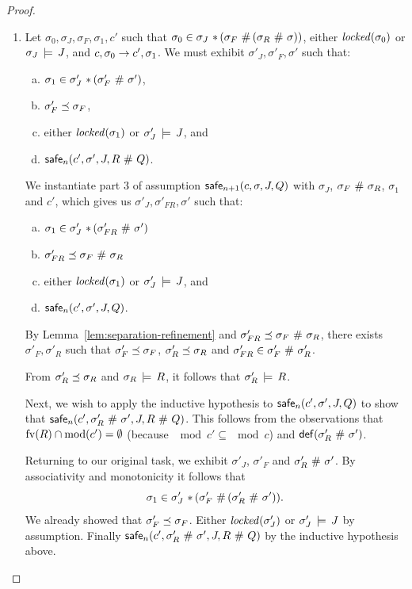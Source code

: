 \documentclass[11pt]{report}
\begin{document}
\begin{proof}
\begin{enumerate}
		\item Let $\sigma_0,\sigma_J,\sigma_F,\sigma_1,c'$ such that $\sigma_0 \in \sigma_J \operatorname{\,\ast\,} (\sigma_F \operatorname{\,\#\,} (\sigma_R \operatorname{\,\#\,} \sigma))$, either $\mathit{locked}(\sigma_0)$ or $\sigma_J \,\models\, J$, and $c,\sigma_0 \rightarrow c',\sigma_1$. We must exhibit $\sigma'_J,\sigma'_F,\sigma'$ such that: \begin{enumerate}[(a)]
			\item $\sigma_1 \in \sigma'_J \operatorname{\,\ast\,} (\sigma'_F \operatorname{\,\#\,} \sigma')$,
			\item $\sigma'_F \preceq \sigma_F$, 
			\item either $\mathit{locked}(\sigma_1)$ or $\sigma'_J \,\models\, J$, and
			\item $\mathsf{safe}_{n}(c',\sigma',J,R \operatorname{\,\#\,} Q)$. 
		\end{enumerate}

		We instantiate part 3 of assumption $\mathsf{safe}_{n+1}(c,\sigma,J,Q)$ with $\sigma_J$, $\sigma_F \operatorname{\,\#\,} \sigma_R$, $\sigma_1$ and $c'$, which gives us $\sigma'_J, \sigma'_{FR}, \sigma'$ such that: \begin{enumerate}[(a)]
			\item $\sigma_1 \in \sigma'_J \operatorname{\,\ast\,} (\sigma'_{FR} \operatorname{\,\#\,} \sigma')$
			\item $\sigma'_{FR} \preceq \sigma_F \operatorname{\,\#\,} \sigma_R$
			\item either $\mathit{locked}(\sigma_1)$ or $\sigma'_J \,\models\, J$, and
			\item $\mathsf{safe}_{n}(c',\sigma',J,Q)$.
		\end{enumerate}	

		By Lemma~\ref{lem:separation-refinement} and $\sigma'_{FR} \preceq \sigma_F \operatorname{\,\#\,} \sigma_R$, there exists $\sigma'_F,\sigma'_R$ such that $\sigma'_F \preceq \sigma_F$, $\sigma'_R \preceq \sigma_R$ and $\sigma'_{FR} \in \sigma'_F \operatorname{\,\#\,} \sigma'_R$. 

		From $\sigma'_R \preceq \sigma_R$ and $\sigma_R \,\models\, R$, it follows that $\sigma'_R \,\models\, R$. 

		Next, we wish to apply the inductive hypothesis to $\mathsf{safe}_{n}(c',\sigma',J,Q)$ to show that $\mathsf{safe}_{n}(c',\sigma'_R \operatorname{\,\#\,} \sigma',J,R \operatorname{\,\#\,} Q)$. This follows from the observations that $\mathrm{fv}(R) \cap \mathrm{mod}(c') = \operatorname{\emptyset}$ (because $\mod{c'} \subseteq \mod{c}$) and $\mathsf{def}(\sigma'_R \operatorname{\,\#\,} \sigma')$. 

		Returning to our original task, we exhibit $\sigma'_J$, $\sigma'_F$ and $\sigma'_R \operatorname{\,\#\,} \sigma'$. By associativity and monotonicity it follows that \[ \sigma_1 \in \sigma'_J \operatorname{\,\ast\,} (\sigma'_F \operatorname{\,\#\,} (\sigma'_R \operatorname{\,\#\,} \sigma')).\] We already showed that $\sigma'_F \preceq \sigma_F$. Either $\mathit{locked}(\sigma'_J)$ or $\sigma'_J \,\models\, J$ by assumption. Finally $\mathsf{safe}_{n}(c',\sigma'_R \operatorname{\,\#\,} \sigma',J,R \operatorname{\,\#\,} Q)$ by the inductive hypothesis above. 

	\end{enumerate}
\end{proof}
\end{document}
